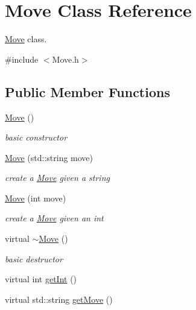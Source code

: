 \hypertarget{class_move}{\section{Move Class Reference}
\label{class_move}
}


\hyperlink{class_move}{Move} class.  




{\ttfamily \#include $<$Move.\+h$>$}

\subsection*{Public Member Functions}
\begin{DoxyCompactItemize}
\item 
\hypertarget{class_move_a4b1acc3a67d30c385ad9a6000526393a}{\hyperlink{class_move_a4b1acc3a67d30c385ad9a6000526393a}{Move} ()}\label{class_move_a4b1acc3a67d30c385ad9a6000526393a}

\begin{DoxyCompactList}\small\item\em basic constructor \end{DoxyCompactList}\item 
\hyperlink{class_move_af110422992fe93377e2522be3f7ff00a}{Move} (std\+::string move)
\begin{DoxyCompactList}\small\item\em create a \hyperlink{class_move}{Move} given a string \end{DoxyCompactList}\item 
\hyperlink{class_move_ad570e8fbf1931e8d36ca437b1ee5f137}{Move} (int move)
\begin{DoxyCompactList}\small\item\em create a \hyperlink{class_move}{Move} given an int \end{DoxyCompactList}\item 
\hypertarget{class_move_aadd37321983fc477287bf7c6d1c0bacf}{virtual \hyperlink{class_move_aadd37321983fc477287bf7c6d1c0bacf}{$\sim$\+Move} ()}\label{class_move_aadd37321983fc477287bf7c6d1c0bacf}

\begin{DoxyCompactList}\small\item\em basic destructor \end{DoxyCompactList}\item 
virtual int \hyperlink{class_move_a79511a68b327d28f72b6d7a590a3226d}{get\+Int} ()
\item 
\hypertarget{class_move_acf538257813b49d20bc598dab697f163}{virtual std\+::string \hyperlink{class_move_acf538257813b49d20bc598dab697f163}{get\+Move} ()}\label{class_move_acf538257813b49d20bc598dab697f163}


\end{DoxyCompactItemize}
